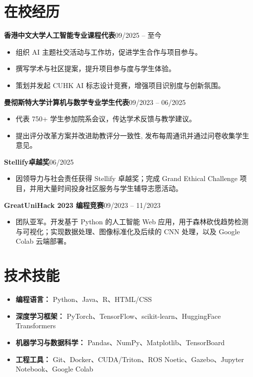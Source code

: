 \documentclass[a4paper,10pt]{article}
\newcommand{\entry}[2]{%
  \noindent\textbf{#1}\hfill#2\par%
}
\begin{document}
\section*{在校经历}

\entry{香港中文大学人工智能专业课程代表}{09/2025 -- 至今}
\begin{itemize}
  \item 组织 AI 主题社交活动与工作坊，促进学生合作与项目参与。
  \item 撰写学术与社区提案，提升项目参与度与学生体验。
  \item 策划并发起 CUHK AI 标志设计竞赛，增强项目识别度与创新氛围。
\end{itemize}

\vspace{5pt}
\entry{曼彻斯特大学计算机与数学专业学生代表}{09/2023 -- 06/2025}
\begin{itemize}
  \item 代表 750+ 学生参加院系会议，传达学术反馈与教学建议。
  \item 提出评分改革方案并改进助教评分一致性, 发布每周通讯并通过问卷收集学生意见。
\end{itemize}

\vspace{5pt}
\entry{Stellify卓越奖}{06/2025}
\begin{itemize}
  \item 因领导力与社会责任获得 Stellify 卓越奖；完成 Grand Ethical Challenge 项目，并用大量时间投身社区服务与学生辅导志愿活动。
\end{itemize}

\vspace{5pt}
\entry{GreatUniHack 2023 编程竞赛}{09/2023 -- 11/2023}
\begin{itemize}
  \item 团队亚军。开发基于 Python 的人工智能 Web 应用，用于森林砍伐趋势检测与可视化；实现数据处理、图像标准化及后续的 CNN 处理，以及 Google Colab 云端部署。
\end{itemize}

\section*{技术技能}

\begin{itemize}
  \item \textbf{编程语言：} Python、Java、R、HTML/CSS
  \item \textbf{深度学习框架：} PyTorch、TensorFlow、scikit-learn、HuggingFace Transformers
  \item \textbf{机器学习与数据科学：} Pandas、NumPy、Matplotlib、TensorBoard
  \item \textbf{工程工具：} Git、Docker、CUDA/Triton、ROS Noetic、Gazebo、Jupyter Notebook、Google Colab
\end{itemize}
\end{document}
